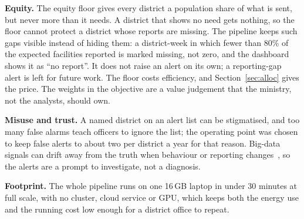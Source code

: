 \textbf{Equity.} The equity floor gives every district a population share of what is sent, but never more than
it needs. A district that shows no need gets nothing, so the floor cannot protect a district whose reports are
missing. The pipeline keeps such gaps visible instead of hiding them: a district-week in which fewer than 80\%
of the expected facilities reported is marked missing, not zero, and the dashboard shows it as ``no report''.
It does not raise an alert on its own; a reporting-gap alert is left for future work. The floor costs
efficiency, and Section~\ref{sec:alloc} gives the price. The weights in the objective are a value judgement
that the ministry, not the analysts, should own.

\textbf{Misuse and trust.} A named district on an alert list can be stigmatised, and too many false alarms
teach officers to ignore the list; the operating point was chosen to keep false alerts to about two per district
a year for that reason. Big-data signals can drift away from the truth when behaviour or reporting
changes~\cite{lazer2014flu}, so the alerts are a prompt to investigate, not a diagnosis.

\textbf{Footprint.} The whole pipeline runs on one 16\,GB laptop in under 30 minutes at full scale, with no
cluster, cloud service or GPU, which keeps both the energy use and the running cost low enough for a district
office to repeat.
